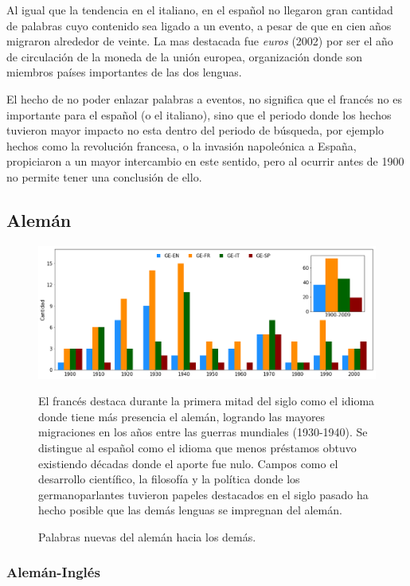 Al igual que la tendencia en el italiano, en el español no llegaron gran cantidad de palabras cuyo contenido sea ligado a un evento, a pesar de que en cien años migraron alrededor de veinte. La mas destacada fue \textit{euros} (2002) por ser el año de circulación de la moneda de la unión europea, organización donde son miembros países importantes de las dos lenguas. 

El hecho de no poder enlazar palabras a eventos, no significa que el francés no es importante para el español (o el italiano), sino que el periodo donde los hechos tuvieron mayor impacto no esta dentro del periodo de búsqueda,  por ejemplo hechos como la revolución francesa, o la invasión napoleónica a España, propiciaron a un mayor intercambio en este sentido, pero al ocurrir antes de 1900 no permite tener una conclusión de ello. 


\subsection{Alemán}%

\begin{figure}[h!]
	\centering
	\includegraphics[scale=.38]{Cap_3/NC_GE.png}
	\label{fig.NC_GE}
	\caption{Palabras nuevas del alemán hacia los demás.}
	\smallskip
	\small
	El francés destaca durante la primera mitad del siglo como el idioma donde tiene más presencia el alemán, logrando las mayores migraciones en los años entre las guerras mundiales (1930-1940). Se distingue al español como el idioma que menos préstamos obtuvo  existiendo décadas donde el aporte fue nulo.  Campos como el desarrollo científico, la filosofía  y la política donde los germanoparlantes tuvieron papeles destacados en el siglo pasado ha hecho posible que las demás lenguas se impregnan del alemán.
\end{figure}




\subsubsection*{Alemán-Inglés}%

